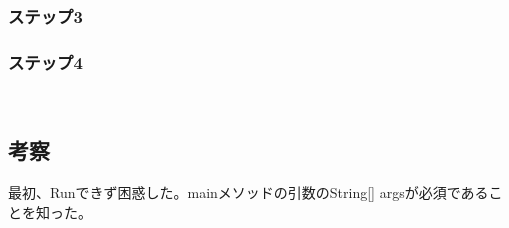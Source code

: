 \documentclass[12pt]{jsarticle}
\begin{document}
\subsubsection{ステップ3}


\subsubsection{ステップ4}
\begin{shadebox}
\begin{verbatim}
    
\end{verbatim}
\end{shadebox}
\vspace{10pt}

\subsection{考察}
最初、Runできず困惑した。mainメソッドの引数のString[] argsが必須であることを知った。

\bigskip




\end{document}
